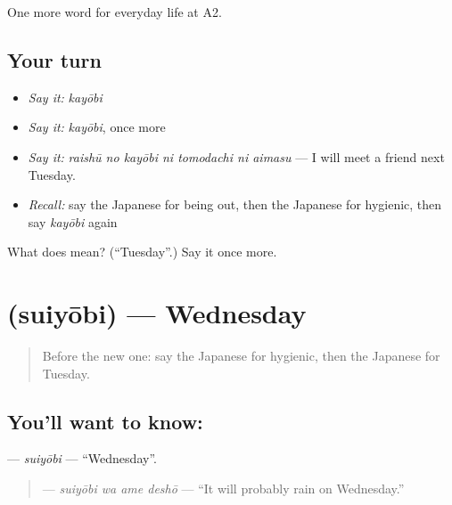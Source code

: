 \begin{grammarlens}[title={What you've built}]
One more word for everyday life at A2.
\end{grammarlens}

\subsection*{Your turn}
\begin{itemize}
\raggedright
  \item \emph{Say it:} \emph{kayōbi}
  \item \emph{Say it:} \emph{kayōbi}, once more
  \item \emph{Say it:} \emph{raishū no kayōbi ni tomodachi ni aimasu} — I will meet a friend next Tuesday.
  \item \emph{Recall:} say the Japanese for being out, then the Japanese for hygienic, then say \emph{kayōbi} again
\end{itemize}

\begin{tcolorbox}[breakable,colback=teal!4,colframe=teal!35!black,title={Before you move on}]
What does  mean? (\textquotedblleft{}Tuesday\textquotedblright{}.) Say it once more.
\end{tcolorbox}
\section[\texorpdfstring{\ja{すいようび} (suiyōbi)}{すいようび (suiyōbi)}]{ (suiyōbi) — Wednesday}

\label{lesson:JA-C164-suiyoubi}



\begin{quote}
Before the new one: say the Japanese for hygienic, then the Japanese for Tuesday.
\end{quote}

\subsection*{You'll want to know: }
\textbf{} — \emph{suiyōbi} — \textquotedblleft{}Wednesday\textquotedblright{}.

\begin{quote}
\textbf{ } — \emph{suiyōbi wa ame deshō} — \textquotedblleft{}It will probably rain on Wednesday.\textquotedblright{}
\end{quote}


